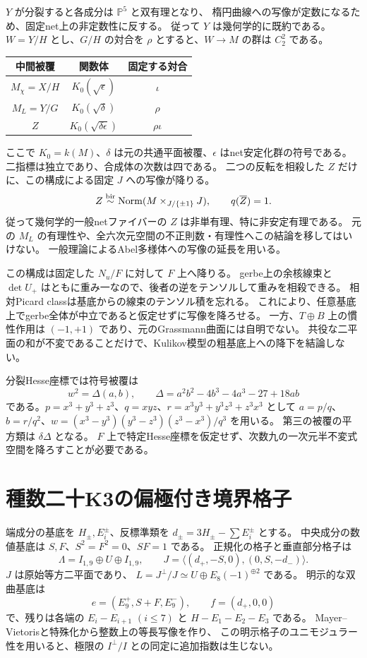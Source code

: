 $Y$ が分裂すると各成分は $\mathbb P^5$ と双有理となり、
楕円曲線への写像が定数になるため、固定net上の非定数性に反する。
従って $Y$ は幾何学的に既約である。
$W=Y/H$ とし、$G/H$ の対合を $\rho$ とすると、$W\to M$ の群は $C_2^2$ である。
\begin{center}\small
\begin{tabular}{c|c|c}
中間被覆&関数体&固定する対合\\\hline
$M_\chi=X/H$&$K_0(\sqrt\epsilon)$&$\iota$\\
$M_L=Y/G$&$K_0(\sqrt\delta)$&$\rho$\\
$Z$&$K_0(\sqrt{\delta\epsilon})$&$\rho\iota$
\end{tabular}
\end{center}
ここで $K_0=k(M)$、$\delta$ は元の共通平面被覆、$\epsilon$ はnet安定化群の符号である。
二指標は独立であり、合成体の次数は四である。
二つの反転を相殺した $Z$ だけに、この構成による固定 $J$ への写像が降りる。
\[
 Z\mathrel{\overset{\mathrm{bir}}{\sim}}\operatorname{Norm}(M\times_{J/\{\pm1\}}J),
 \qquad q(\overline Z)=1.
\]
従って幾何学的一般netファイバーの $Z$ は非単有理、特に非安定有理である。
元の $M_L$ の有理性や、全六次元空間の不正則数・有理性へこの結論を移してはいけない。
一般理論によるAbel多様体への写像の延長を用いる\cite[I, \S3]{MilneAbelianVarieties2008}。

この構成は固定した $N_u/F$ に対して $F$ 上へ降りる。
gerbe上の余核線束と $\det U_+$ はともに重み一なので、後者の逆をテンソルして重みを相殺できる。
相対Picard classは基底からの線束のテンソル積を忘れる。
これにより、任意基底上でgerbe全体が中立であると仮定せずに写像を降ろせる。
一方、$T\oplus B$ 上の慣性作用は $(-1,+1)$ であり、元のGrassmann曲面には自明でない。
共役な二平面の和が不変であることだけで、Kulikov模型の粗基底上への降下を結論しない。

分裂Hesse座標では符号被覆は
\[
 w^2=\Delta(a,b),\qquad
 \Delta=a^2b^2-4b^3-4a^3-27+18ab
\]
である。$p=x^3+y^3+z^3$、$q=xyz$、$r=x^3y^3+y^3z^3+z^3x^3$ として
$a=p/q$、$b=r/q^2$、$w=(x^3-y^3)(y^3-z^3)(z^3-x^3)/q^3$ を用いる。
第三の被覆の平方類は $\delta\Delta$ となる。
$F$ 上で特定Hesse座標を仮定せず、次数九の一次元半不変式空間を降ろすことが必要である。

\section{種数二十K3の偏極付き境界格子}
\label{sec:notes-boundary-lattice-v29}
端成分の基底を $H_\pm,E_i^\pm$、反標準類を $d_\pm=3H_\pm-\sum E_i^\pm$ とする。
中央成分の数値基底は $S,F$、$S^2=F^2=0$、$SF=1$ である。
正規化の格子と垂直部分格子は
\[
 \Lambda=I_{1,9}\oplus U\oplus I_{1,9},\qquad
 J=\langle(d_+,-S,0),(0,S,-d_-)\rangle.
\]
$J$ は原始等方二平面であり、
$L=J^\perp/J\simeq U\oplus E_8(-1)^{\oplus2}$ である。
明示的な双曲基底は
\[
 e=(E_9^+,S+F,E_9^-),\qquad f=(d_+,0,0)
\]
で、残りは各端の $E_i-E_{i+1}$ $(i\le7)$ と $H-E_1-E_2-E_3$ である。
Mayer--Vietorisと特殊化から整数上の等長写像を作り、
この明示格子のユニモジュラー性を用いると、極限の $I^\perp/I$ との同定に追加指数は生じない。

